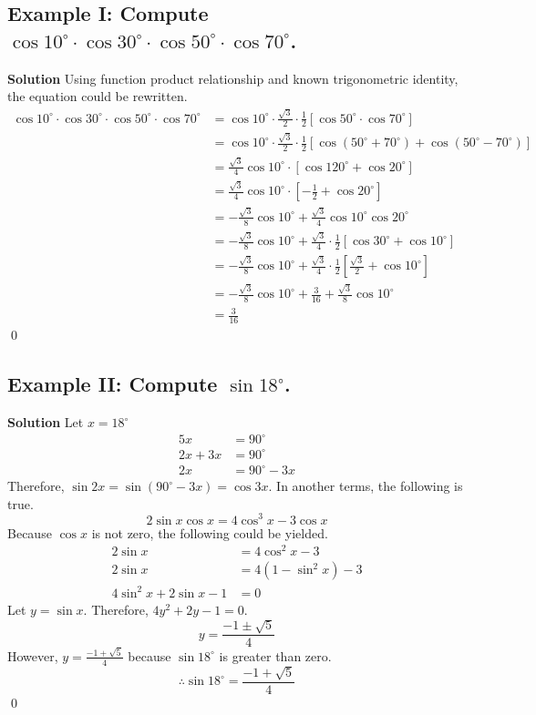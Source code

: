 \documentclass{article}
\newenvironment{solution}{\begin{trivlist}\item[]{\bf Solution}}
    {\qed \end{trivlist}}
\begin{document}
\subsection{Example I: Compute $\cos10^{\circ}\cdot\cos30^{\circ}\cdot\cos50^{\circ}\cdot\cos70^{\circ}$.}
\begin{solution}
    Using function product relationship and known trigonometric identity, the equation could be rewritten.
    \begin{align*}
    \cos10^{\circ}\cdot\cos30^{\circ}\cdot\cos50^{\circ}\cdot\cos70^{\circ}
    &=\cos10^{\circ}\cdot\frac{\sqrt{3}}{2}\cdot\frac{1}{2}[\cos50^{\circ}\cdot\cos70^{\circ}] \\
    &=\cos10^{\circ}\cdot\frac{\sqrt{3}}{2}\cdot\frac{1}{2}[\cos(50^{\circ}+70^{\circ})+\cos(50^{\circ}-70^{\circ})] \\
    &=\frac{\sqrt{3}}{4}\cos10^{\circ}\cdot[\cos120^{\circ}+\cos20^{\circ}] \\
    &=\frac{\sqrt{3}}{4}\cos10^{\circ}\cdot[-\frac{1}{2}+\cos20^{\circ}] \\
    &=-\frac{\sqrt{3}}{8}\cos10^{\circ}+\frac{\sqrt{3}}{4}\cos10^{\circ}\cos20^{\circ} \\
    &=-\frac{\sqrt{3}}{8}\cos10^{\circ}+\frac{\sqrt{3}}{4}\cdot\frac{1}{2}[\cos30^{\circ}+\cos10^{\circ}] \\
    &=-\frac{\sqrt{3}}{8}\cos10^{\circ}+\frac{\sqrt{3}}{4}\cdot\frac{1}{2}[\frac{\sqrt{3}}{2}+\cos10^{\circ}] \\
    &=-\frac{\sqrt{3}}{8}\cos10^{\circ}+\frac{3}{16}+\frac{\sqrt{3}}{8}\cos10^{\circ} \\
    &=\boxed{\frac{3}{16}}
    \end{align*}
\end{solution}

\subsection{Example II: Compute $\sin18^{\circ}$.}
\begin{solution}
    Let $x=18^{\circ}$
    \begin{align*}
        5x&=90^{\circ} \\
        2x+3x&=90^{\circ} \\
        2x&=90^{\circ}-3x
    \end{align*}
    Therefore, $\sin2x=\sin(90^{\circ}-3x)=\cos3x$. In another terms, the following is true.
    \[
    2\sin x\cos x=4\cos^3x-3\cos x
    \]
    Because $\cos x$ is not zero, the following could be yielded.
    \begin{align*}
    2\sin x&=4\cos^2x-3 \\
    2\sin x&=4(1-\sin^2x)-3 \\
    4\sin^2x+2\sin x-1&=0
    \end{align*}
    Let $y=\sin x$. Therefore, $4y^2+2y-1=0$.
    \[
    y=\frac{-1\pm\sqrt{5}}{4}
    \]
    However, $y=\frac{-1+\sqrt{5}}{4}$ because $\sin18^{\circ}$ is greater than zero.
    \[
    \therefore \sin18^{\circ}=\boxed{\frac{-1+\sqrt{5}}{4}}
    \]
\end{solution}
\end{document}
